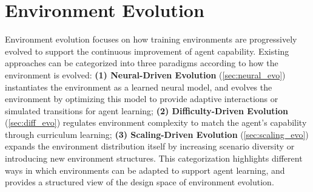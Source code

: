 \documentclass{llmxive}
\begin{document}
\section{Environment Evolution}\label{sec:env_evo}
Environment evolution focuses on how training environments are progressively evolved to support the continuous improvement of agent capability.
%
Existing approaches can be categorized into three paradigms according to how the environment is evolved:
\textbf{(1) Neural-Driven Evolution} (\cref{sec:neural_evo}) instantiates the environment as a learned neural model, and evolves the environment by optimizing this model to provide adaptive interactions or simulated transitions for agent learning;
\textbf{(2) Difficulty-Driven Evolution} (\cref{sec:diff_evo}) regulates environment complexity to match the agent's capability through curriculum learning;
\textbf{(3) Scaling-Driven Evolution} (\cref{sec:scaling_evo}) expands the environment distribution itself by increasing scenario diversity or introducing new environment structures.
%
This categorization highlights different ways in which environments can be adapted to support agent learning, and provides a structured view of the design space of environment evolution.
%
\end{document}
